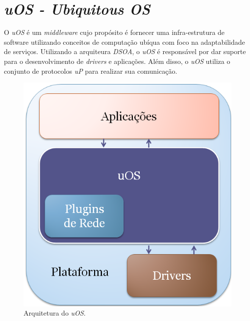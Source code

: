 \section{\emph{uOS - Ubiquitous OS}}

O \emph{uOS} é um \emph{middleware} cujo propósito é fornecer uma infra-estrutura de software utilizando conceitos de computação ubíqua com foco na adaptabilidade de serviços. Utilizando a arquiteura \emph{DSOA}, o \emph{uOS} é responsável por dar suporte para o desenvolvimento de \emph{drivers} e aplicações. Além disso, o \emph{uOS} utiliza o conjunto de protocolos \emph{uP} para realizar sua comunicação.

\begin{figure}[ht]
	\center
	\includegraphics[scale=0.4]{imagens/ecossistemaUbiquitos}
	\caption{Arquitetura do \emph{uOS}.}
	\label{fig:ecossistemaUbiquitos}
\end{figure}

